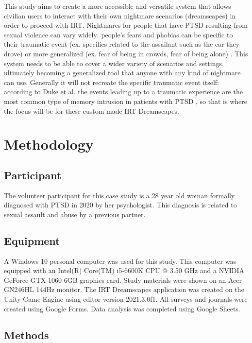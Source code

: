 \documentclass{article}
\begin{document}
This study aims to create a more accessible and versatile system that allows civilian users to interact with their own nightmare scenarios (dreamscapes) in order to proceed with IRT. Nightmares for people that have PTSD resulting from sexual violence can vary widely: people's fears and phobias can be specific to their traumatic event (ex. specifics related to the assailant such as the car they drove) or more generalized (ex. fear of being in crowds, fear of being alone) \cite{WU}. This system needs to be able to cover a wider variety of scenarios and settings, ultimately becoming a generalized tool that anyone with any kind of nightmare can use. Generally it will not recreate the specific traumatic event itself: according to Duke et al. the events leading up to a traumatic experience are the most common type of memory intrusion in patients with PTSD \cite{Duke}, so that is where the focus will be for these custom made IRT Dreamscapes.

\section*{Methodology}
\subsection*{Participant}

The volunteer participant for this case study is a 28 year old woman formally diagnosed with PTSD in 2020 by her psychologist. This diagnosis is related to sexual assault and abuse by a previous partner.

\subsection*{Equipment}

A Windows 10 personal computer was used for this study. This computer was equipped with an Intel(R) Core(TM) i5-6600K CPU @ 3.50 GHz and a NVIDIA GeForce GTX 1060 6GB graphics card. Study materials were shown on an Acer GN246HL 144Hz monitor. The IRT Dreamscapes application was created on the Unity Game Engine using editor version 2021.3.0f1. All surveys and journals were created using Google Forms. Data analysis was completed using Google Sheets.

\subsection*{Methods}
\end{document}
